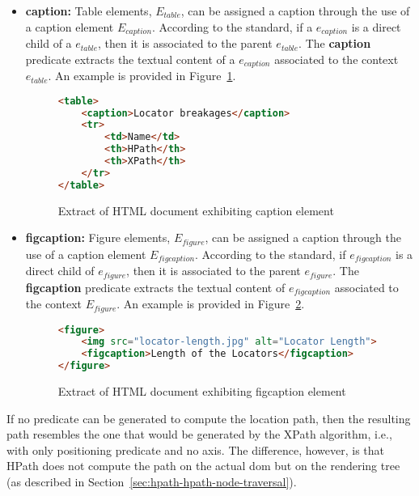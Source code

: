 \begin{itemize}
    \item \textbf{caption:} Table elements, $E_{table}$, can be assigned a caption through the use of a caption element $E_{caption}$. According to the standard, if a $e_{caption}$ is a direct child of a $e_{table}$, then it is associated to the parent $e_{table}$. The \textbf{caption} predicate extracts the textual content of a $e_{caption}$ associated to the context $e_{table}$. An example is provided in Figure~\ref{fig:html-document-caption}.

\begin{figure}[h]
\centering
\caption{Extract of HTML document exhibiting caption element}
\label{fig:html-document-caption}
\begin{minipage}{0.8\linewidth}
\begin{lstlisting}[language=HTML]
<table>
    <caption>Locator breakages</caption>
    <tr>
        <td>Name</td>
        <th>HPath</th>
        <th>XPath</th>
    </tr>
</table>
\end{lstlisting}
\end{minipage}
\end{figure}

    \item \textbf{figcaption:} Figure elements, $E_{figure}$, can be assigned a caption through the use of a caption element $E_{figcaption}$. According to the standard, if $e_{figcaption}$ is a direct child of $e_{figure}$, then it is associated to the parent $e_{figure}$. The \textbf{figcaption} predicate extracts the textual content of $e_{figcaption}$ associated to the context $E_{figure}$. An example is provided in Figure~\ref{fig:html-document-figcaption}.
    
\begin{figure}[h]
\centering
\caption{Extract of HTML document exhibiting figcaption element}
\label{fig:html-document-figcaption}
\begin{minipage}{0.8\linewidth}
\begin{lstlisting}[language=HTML]
<figure>
    <img src="locator-length.jpg" alt="Locator Length">
    <figcaption>Length of the Locators</figcaption>
</figure>
\end{lstlisting}
\end{minipage}
\end{figure}
    
\end{itemize}

If no predicate can be generated to compute the location path, then the resulting path resembles the one that would be generated by the XPath algorithm, i.e., with only positioning predicate and no axis. The difference, however, is that HPath does not compute the path on the actual \gls{dom} but on the rendering tree (as described in Section~\ref{sec:hpath-hpath-node-traversal}).

